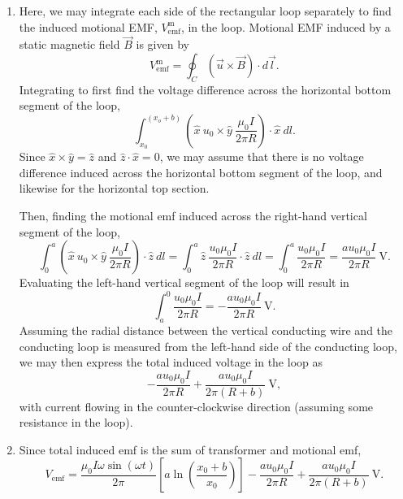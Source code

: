\documentclass{article}
\begin{document}
\begin{enumerate}
\begin{enumerate}[label=\alph*)]
			Putting everything together, 
			\[
				V_{\mathrm{emf}}^{\mathrm{tf}} = \int_{S} \left[ \hat{y} \ \frac{\mu_0 I_0 \omega}{2 \pi x} \sin{(\omega t)}\right] \cdot \left[\hat{y} \ dx \ dz \right].
			\]
			Simplifing and pulling out constants,
			\[
				V^{\mathrm{tf}}_{\mathrm{emf}} = \frac{\mu_0 I_0 \omega \sin{(\omega t)}}{2\pi} \int_S \frac{1}{x} \ dx \ dz = \frac{\mu_0 I_0 \omega \sin{(\omega t)}}{2\pi} \int_{0}^{a} \int_{x_0}^{x_0 + b} \frac{1}{x} \ dx \ dz.
			\]
			Solving, 
			\[
				V_{\mathrm{emf}}^{\mathrm{tf}} = \frac{\mu_0 I_0 \omega \sin{(\omega t)}}{2\pi} \left[ a\ln\left(\frac{x_0 + b}{x_0}\right)\right] \ \mathrm{V},
			\]
			with current flowing in the counter-clockwise direction.
			\item
				Here, we may integrate each side of the rectangular loop separately to find the induced motional EMF, \(V_{\mathrm{emf}}^{\mathrm{m}}\), in the loop. Motional EMF induced by a static magnetic field \(\vec{B}\) is given by
				\[
					V_{\mathrm{emf}}^{\mathrm{m}} = \oint_C (\vec{u} \times \vec{B}) \cdot d \vec{l}.
				\]
				Integrating to first find the voltage difference across the horizontal bottom segment of the loop, 
				\[
				  \int_{x_0}^{(x_o+b)} \left(\hat{x} \ u_0 \times \hat{y} \ \frac{\mu_0 I}{2 \pi R}\right) \cdot \hat{x} \ dl.
				\]
				Since \(\hat{x} \times \hat{y} = \hat{z}\) and \(\hat{z} \cdot \hat{x} = 0\), we may assume that there is no voltage difference induced across the horizontal bottom segment of the loop, and likewise for the horizontal top section.

				Then, finding the motional emf induced across the right-hand vertical segment of the loop,
				\[
					\int_{0}^{a}\left(\hat{x} \ u_0 \times \hat{y} \ \frac{\mu_0 I}{2 \pi R} \right) \cdot \hat{z} \ dl = \int_{0}^{a}\hat{z} \ \frac{u_0\mu_0I}{2 \pi R} \cdot \hat{z} \ dl = \int_{0}^{a} \frac{u_0\mu_0I}{2\pi R} = \frac{au_0\mu_0I}{2\pi R} \ \mathrm{V}.
				\]
				Evaluating the left-hand vertical segment of the loop will result in 
				\[
					\int_{a}^{0}\frac{u_0\mu_0 I}{2\pi R} = -\frac{au_0\mu_0 I}{2\pi R} \ \mathrm{V}.
				\]
				Assuming the radial distance between the vertical conducting wire and the conducting loop is measured from the left-hand side of the conducting loop, we may then express the total induced voltage in the loop as 
				\[
					-\frac{au_0\mu_0I}{2 \pi R} + \frac{au_0\mu_0 I}{2\pi (R+b)} \ \mathrm{V},
				\]
				with current flowing in the counter-clockwise direction (assuming some resistance in the loop).
			\item Since total induced emf is the sum of transformer and motional emf,
				\[
					V_{\mathrm{emf}} = \frac{\mu_0I\omega\sin{(\omega t)}}{2\pi}\left[a \ln{\left(\frac{x_0 + b}{x_0}\right)}\right] - \frac{au_0\mu_0I}{2\pi R} + \frac{au_0\mu_0I}{2\pi(R+b)} \ \mathrm{V}.
				\]
		\end{enumerate}
\end{enumerate}
\end{document}
